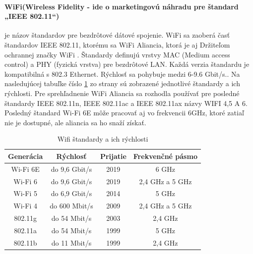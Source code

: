\documentclass[../../main.tex]{subfiles}
\begin{document}
\paragraph{WiFi(Wireless Fidelity - ide o marketingovú náhradu pre štandard „IEEE 802.11“\cite{wifi_fontech})} je názov štandardov pre bezdrôtové dátové spojenie. WiFi sa zaoberá časť štandardov IEEE 802.11,%
ktorému sa WiFi Aliancia, ktorá je aj Držiteľom ochrannej značky WiFi \cite{tanenbaum,wifi_fontech}. Štandardy definujú vrstvy MAC (Medium access control) a PHY (fyzická vrstva)  pre bezdrôtové LAN. Každá verzia štandardu je kompatibilná s 802.3 Ethernet\cite{wlan_wifi_diff}. Rýchlosť sa pohybuje medzi 6-9.6 Gbit/s.\cite{wifi_fontech}. Na nasledujúcej tabuľke číslo \ref{tab:wifi_stan} zo strany \pageref{tab:wifi_stan} sú zobrazené jednotlivé štandardy a ich rýchlosti. Pre sprehľadnenie WiFi Aliancia sa rozhodla používať pre posledné štandardy IEEE 802.11n, IEEE 802.11ac a IEEE 802.11ax názvy WIFI 4,5 A 6. Posledný štandard Wi-Fi 6E môže pracovať aj vo frekvencii 6GHz, ktoré zatiaľ nie je dostupné, ale aliancia sa ho snaží získať.





\begin{table}[h]
    \centering
    \begin{tabular}{|c|c|c|c|}
        \hline
        \textbf{Generácia} &	\textbf{Rýchlosť} & \textbf{Prijatie}	& \textbf{Frekvenčné pásmo}
        \\
        \hline
        Wi-Fi 6E & 	do 9,6 Gbit/s &	2019 &	6 GHz \\
        \hline
        Wi-Fi 6	& do 9,6 Gbit/s &	2019 &	2,4 GHz a 5 GHz \\
        \hline
        Wi-Fi 5	& do 6,9 Gbit/s &	2014 &	5 GHz \\
        \hline
        Wi-Fi 4	& do 600 Mbit/s &	2009 &	2,4 GHz a 5 GHz \\
        \hline
        802.11g	& do 54 Mbit/s &	2003 &	2,4 GHz \\
        \hline
        802.11a	& do 54 Mbit/s &	1999 &	5 GHz \\
        \hline
        802.11b	& do 11 Mbit/s &	1999 &	2,4 GHz \\
        \hline
    \end{tabular}
    \caption{Wifi štandardy a ich rýchlosti\cite{wifi_fontech}}
    \label{tab:wifi_stan}
\end{table}
\end{document}
